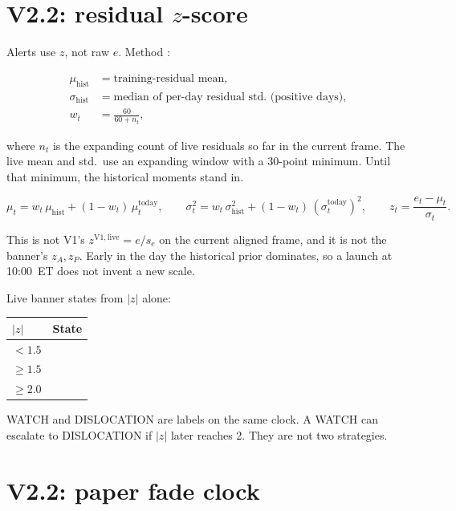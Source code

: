 \documentclass[11pt]{article}
\newcommand{\code}[1]{\texttt{\detokenize{#1}}}
\newcommand{\abs}[1]{\lvert #1 \rvert}
\begin{document}
\section{V2.2: residual \(z\)-score}

Alerts use \(z\), not raw \(e\).  Method \code{prior_blend_v1}:

\begin{align}
  \mu_{\mathrm{hist}} &= \text{training-residual mean}, \\
  \sigma_{\mathrm{hist}} &= \text{median of per-day residual std.\ (positive days)}, \\
  w_t &= \frac{60}{60 + n_t},
\end{align}

where \(n_t\) is the expanding count of live residuals so far in
the current frame.  The live mean and std.\ use an expanding window
with a 30-point minimum.  Until that minimum, the historical
moments stand in.

\begin{equation}
  \mu_t = w_t\,\mu_{\mathrm{hist}} + (1-w_t)\,\mu^{\mathrm{today}}_t,
  \qquad
  \sigma_t^2 = w_t\,\sigma_{\mathrm{hist}}^2 + (1-w_t)\,(\sigma^{\mathrm{today}}_t)^2,
  \qquad
  z_t = \frac{e_t - \mu_t}{\sigma_t}.
\end{equation}

This is not V1's \(z^{\mathrm{V1,live}}=e/s_e\) on the current
aligned frame, and it is not the banner's \(z_A,z_P\).  Early in
the day the historical prior dominates, so a launch at 10:00~ET
does not invent a new scale.

Live banner states from \(\abs{z}\) alone:

\begin{center}
\begin{tabular}{@{}ll@{}}
\toprule
\(\abs{z}\) & State \\
\midrule
\(< 1.5\) & \code{NONE} \\
\(\ge 1.5\) & \code{WATCH} \\
\(\ge 2.0\) & \code{DISLOCATION} \\
\bottomrule
\end{tabular}
\end{center}

WATCH and DISLOCATION are labels on the same clock.  A WATCH can
escalate to DISLOCATION if \(\abs{z}\) later reaches 2.  They are
not two strategies.


\section{V2.2: paper fade clock}
\end{document}
